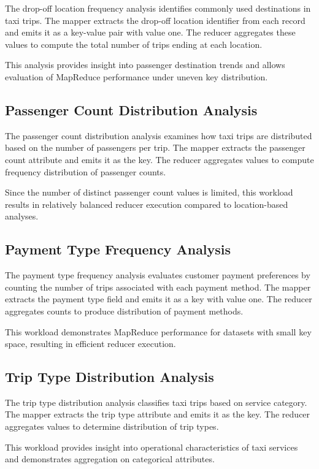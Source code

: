 \documentclass[12pt,a4paper]{report}
\begin{document}
The drop-off location frequency analysis identifies commonly used destinations in taxi
trips. The mapper extracts the drop-off location identifier from each record and emits it
as a key-value pair with value one. The reducer aggregates these values to compute the
total number of trips ending at each location.

This analysis provides insight into passenger destination trends and allows evaluation of
MapReduce performance under uneven key distribution.


\subsection{Passenger Count Distribution Analysis}

The passenger count distribution analysis examines how taxi trips are distributed based
on the number of passengers per trip. The mapper extracts the passenger count
attribute and emits it as the key. The reducer aggregates values to compute frequency
distribution of passenger counts.

Since the number of distinct passenger count values is limited, this workload results in
relatively balanced reducer execution compared to location-based analyses.


\subsection{Payment Type Frequency Analysis}

The payment type frequency analysis evaluates customer payment preferences by
counting the number of trips associated with each payment method. The mapper extracts
the payment type field and emits it as a key with value one. The reducer aggregates
counts to produce distribution of payment methods.

This workload demonstrates MapReduce performance for datasets with small key space,
resulting in efficient reducer execution.


\subsection{Trip Type Distribution Analysis}

The trip type distribution analysis classifies taxi trips based on service category. The
mapper extracts the trip type attribute and emits it as the key. The reducer aggregates
values to determine distribution of trip types.

This workload provides insight into operational characteristics of taxi services and
demonstrates aggregation on categorical attributes.
\end{document}
